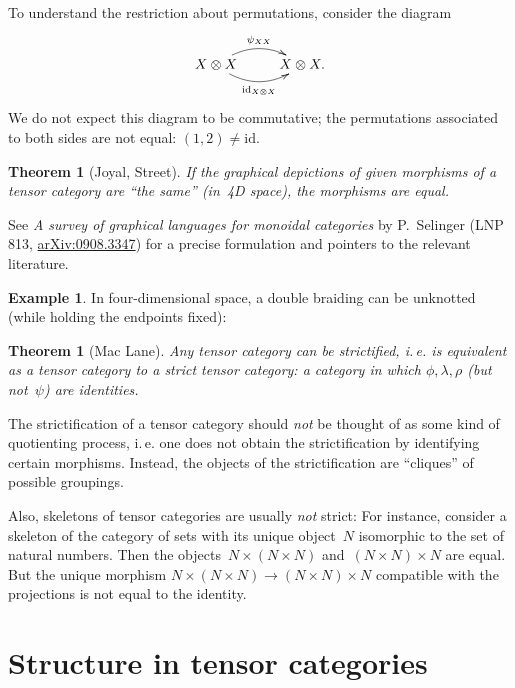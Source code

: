 \documentclass[a4paper,english,12pt]{scrartcl}
\theoremstyle{definition}
\newtheorem{ex}[defn]{Example}
\theoremstyle{plain}
\newtheorem{thm}[defn]{Theorem}
\theoremstyle{remark}
\newcommand{\id}{\mathrm{id}}
\renewcommand{\_}{\mathpunct{.}\,}
\newcommand{\?}{\,{:}\,}
\begin{document}
To understand the restriction about permutations, consider the diagram
\[ \xymatrix{
  X \otimes X \ar@/^1pc/[r]^{\psi_{XX}} \ar@/_1pc/[r]_{\id_{X \otimes X}} & X \otimes X.
} \]
We do not expect this diagram to be commutative; the permutations associated to
both sides are not equal: $(1,2) \neq \id$.

\begin{thm}[Joyal, Street]If the graphical depictions of given morphisms of a
tensor category are ``the same'' (in~4D space), the morphisms are
equal.\end{thm}
See \emph{A survey of graphical languages for monoidal categories}
by P.~Selinger (LNP 813, \href{http://arxiv.org/abs/0908.3347}{arXiv:0908.3347})
for a precise formulation and pointers to the relevant literature.

\begin{ex}In four-dimensional space, a double braiding can be unknotted (while
holding the endpoints fixed):
\begin{center}\scalebox{0.5}{}\end{center}\end{ex}

\begin{thm}[Mac Lane]Any tensor category can be \emph{strictified}, i.\,e. is
equivalent as a tensor category to a \emph{strict} tensor category: a category
in which $\phi, \lambda, \rho$ (but not~$\psi$) are identities.\end{thm}

The strictification of a tensor category should \emph{not} be
thought of as some kind of quotienting process, i.\,e. one does not obtain the
strictification by identifying certain morphisms. Instead, the objects of the
strictification are ``cliques'' of possible groupings.

Also, skeletons of tensor categories are usually \emph{not} strict: For instance,
consider a skeleton of the category of sets with its unique object~$N$
isomorphic to the set of natural numbers. Then the objects~$N \times (N \times N)$
and~$(N \times N) \times N$ are equal. But the unique morphism $N \times (N \times
N) \to (N \times N) \times N$ compatible with the projections is not equal to
the identity.


\section{Structure in tensor categories}
\end{document}
